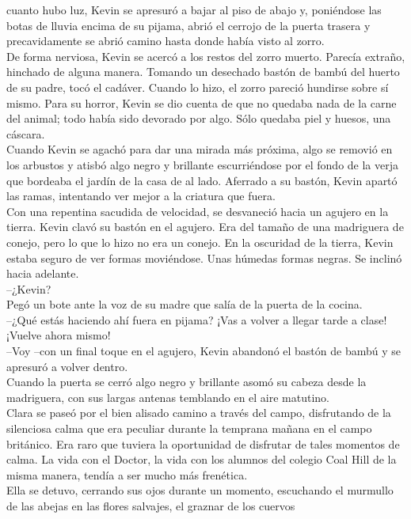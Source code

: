 {cuanto hubo luz, Kevin se apresuró a bajar al piso de abajo y,
poniéndose las botas de lluvia encima de su pijama, abrió el cerrojo de
la puerta trasera y precavidamente se abrió camino hasta donde había
visto al zorro.\\
De forma nerviosa, Kevin se acercó a los restos del zorro muerto.
Parecía extraño, hinchado de alguna manera. Tomando un desechado bastón
de bambú del huerto de su padre, tocó el cadáver. Cuando lo hizo, el
zorro pareció hundirse sobre sí mismo. Para su horror, Kevin se dio
cuenta de que no quedaba nada de la carne del animal; todo había sido
devorado por algo. Sólo quedaba piel y huesos, una cáscara.\\
Cuando Kevin se agachó para dar una mirada más próxima, algo se removió
en los arbustos y atisbó algo negro y brillante escurriéndose por el
fondo de la verja que bordeaba el jardín de la casa de al lado. Aferrado
a su bastón, Kevin apartó las ramas, intentando ver mejor a la criatura
que fuera.\\
Con una repentina sacudida de velocidad, se desvaneció hacia un agujero
en la tierra. Kevin clavó su bastón en el agujero. Era del tamaño de una
madriguera de conejo, pero lo que lo hizo no era un conejo. En la
oscuridad de la tierra, Kevin estaba seguro de ver formas moviéndose.
Unas húmedas formas negras. Se inclinó hacia adelante.\\
--¿Kevin?\\
Pegó un bote ante la voz de su madre que salía de la puerta de la
cocina.\\
--¿Qué estás haciendo ahí fuera en pijama? ¡Vas a volver a llegar tarde
a clase! ¡Vuelve ahora mismo!\\
--Voy --con un final toque en el agujero, Kevin abandonó el bastón de
bambú y se apresuró a volver dentro.\\
Cuando la puerta se cerró algo negro y brillante asomó su cabeza desde
la madriguera, con sus largas antenas temblando en el aire
matutino.\\[2\baselineskip]Clara se paseó por el bien alisado camino a
través del campo, disfrutando de la silenciosa calma que era peculiar
durante la temprana mañana en el campo británico. Era raro que tuviera
la oportunidad de disfrutar de tales momentos de calma. La vida con el
Doctor, la vida con los alumnos del colegio Coal Hill de la misma
manera, tendía a ser mucho más frenética.\\
Ella se detuvo, cerrando sus ojos durante un momento, escuchando el
murmullo de las abejas en las flores salvajes, el graznar de los cuervos
}
